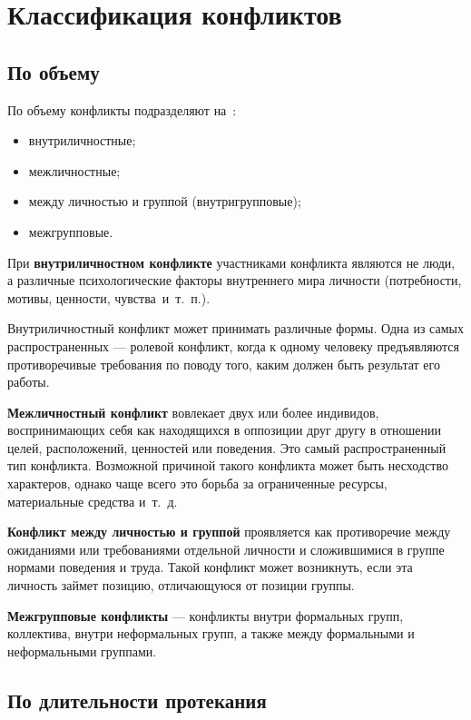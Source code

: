 \chapter{\label{head:03}Классификация конфликтов}

\section{По объему}

По объему конфликты подразделяют на~\cite{book08}:
\begin{itemize}
    \item внутриличностные;
    \item межличностные;
    \item между личностью и группой (внутригрупповые);
    \item межгрупповые.
\end{itemize}

При \textbf{внутриличностном конфликте} участниками конфликта являются не люди,
а различные психологические факторы внутреннего мира личности (потребности,
мотивы, ценности, чувства~и~т.~п.).

Внутриличностный конфликт может принимать различные формы. Одна из самых
распространенных --- ролевой конфликт, когда к одному человеку предъявляются
противоречивые требования по поводу того, каким должен быть результат его
работы.

\textbf{Межличностный конфликт} вовлекает двух или более индивидов,
воспринимающих себя как находящихся в оппозиции друг другу в отношении целей,
расположений, ценностей или поведения. Это самый распространенный тип конфликта.
Возможной причиной такого конфликта может быть несходство характеров, однако
чаще всего это борьба за ограниченные ресурсы, материальные средства и~т.~д. 

\textbf{Конфликт между личностью и группой} проявляется как противоречие между
ожиданиями или требованиями отдельной личности и сложившимися в группе нормами
поведения и труда. Такой конфликт может возникнуть, если эта личность займет
позицию, отличающуюся от позиции группы.

\textbf{Межгрупповые конфликты} --- конфликты внутри формальных групп,
коллектива, внутри неформальных групп, а также между формальными и неформальными
группами.

\section{По длительности протекания}

